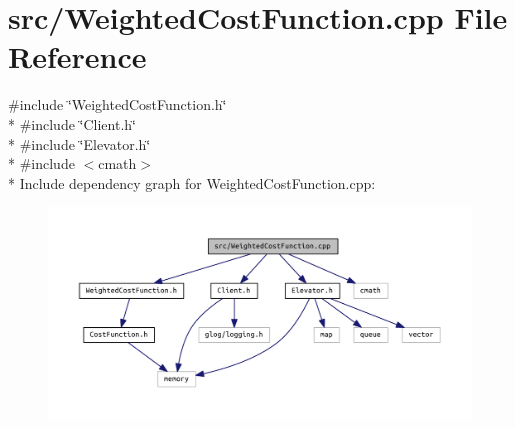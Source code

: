\section{src/\+Weighted\+Cost\+Function.cpp File Reference}
\label{_weighted_cost_function_8cpp}
{\ttfamily \#include \char`\"{}Weighted\+Cost\+Function.\+h\char`\"{}}\\*
{\ttfamily \#include \char`\"{}Client.\+h\char`\"{}}\\*
{\ttfamily \#include \char`\"{}Elevator.\+h\char`\"{}}\\*
{\ttfamily \#include $<$cmath$>$}\\*
Include dependency graph for Weighted\+Cost\+Function.\+cpp\+:
\nopagebreak
\begin{figure}[H]
\begin{center}
\leavevmode
\includegraphics[width=350pt]{_weighted_cost_function_8cpp__incl}
\end{center}
\end{figure}
